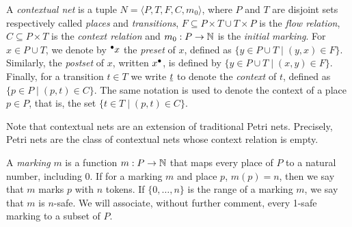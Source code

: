 \documentclass[11pt,a4paper]{article}
\begin{document}
%
%
%
%


A \emph{contextual net} is a tuple $N = \langle P, T, F, C, m_0 \rangle$, where
$P$ and $T$ are disjoint sets respectively called \emph{places} and
\emph{transitions}, $F \subseteq P \times T \cup T \times P$ is the \emph{flow
relation}, $C \subseteq P \times T$ is the \emph{context relation} and $m_0 : P
\to \mathbb{N}$ is the \emph{initial marking}.  For $x \in P \cup T$, we denote by
${}^\bullet x$ the \emph{preset} of $x$, defined as $\{y \in P \cup T \mid (y, x) \in
F\}$.  Similarly, the \emph{postset} of $x$, written $x^\bullet$, is defined by
$\{y \in P \cup T \mid (x, y) \in F\}$.  Finally, for a transition $t \in T$ we
write $\underline{t}$ to denote the \emph{context} of $t$, defined as $\{p \in P \mid
(p, t) \in C\}$.  The same notation is used to denote the context of a place $p
\in P$, that is, the set $\{t \in T \mid (p, t) \in C\}$.

Note that contextual nets are an extension of traditional Petri nets.
Precisely, Petri nets are the class of contextual nets whose context relation
is empty.

A \emph{marking} $m$ is a function $m : P \to \mathbb{N}$ that maps every place of $P$
to a natural number, including 0. If for a marking $m$ and place $p$, $m(p) =
n$, then we say that $m$ marks $p$ with $n$ tokens.  If $\{0, \ldots, n\}$ is
the range of a marking $m$, we say that $m$ is $n$-safe.  We will associate,
without further comment, every 1-safe marking to a subset of $P$.
\end{document}
